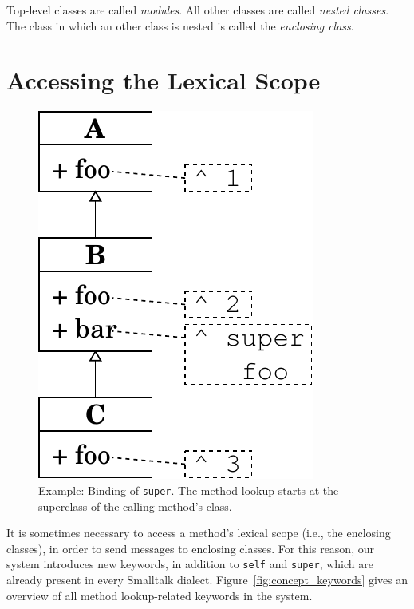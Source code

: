Top-level classes are called \emph{modules}. All other classes are called \emph{nested classes}. The class in which an other class is nested is called the \emph{enclosing class}.


\section{Accessing the Lexical Scope}
\begin{figure}
	\includegraphics[scale=0.75]{super_binding.pdf}
	\centering
	\caption[Example: Binding of \texttt{super}]{Example: Binding of \texttt{super}. The method lookup starts at the superclass of the calling method's class.}
	\label{fig:concept_super_binding}
\end{figure}
It is sometimes necessary to access a method's lexical scope (i.e., the enclosing classes), in order to send messages to enclosing classes. For this reason, our system introduces new keywords, in addition to \texttt{self} and \texttt{super}, which are already present in every Smalltalk dialect. Figure~\ref{fig:concept_keywords} gives an overview of all method lookup-related keywords in the system.

